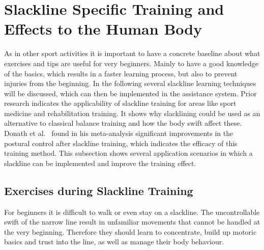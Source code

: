 \section{Slackline Specific Training and Effects to the Human Body}\label{2_2_slacklineTraining}

As in other sport activities it is important to have a concrete baseline about what exercises and tips are useful for very beginners. Mainly to have a good knowledge of the basics, which results in a faster learning process, but also to prevent injuries from the beginning. In the following several slackline learning techniques will be discussed, which can then be implemented in the assistance system. Prior research indicates the applicability of slackline training for areas like sport medicine and rehabilitation training. It shows why slacklining could be used as an alternative to classical balance training and how the body swift affect these. Donath et al.~\cite{Donath2016-rt} found in his meta-analysis significant improvements in the postural control after slackline training, which indicates the efficacy of this training method. This subsection shows several application scenarios in which a slackline can be implemented and improve the training effect.

\subsection{Exercises during Slackline Training}\label{2_1_1_slacklineTraining}

For beginners it is difficult to walk or even stay on a slackline. The uncontrollable swift of the narrow line result in unfamiliar movements that cannot be handled at the very beginning. Therefore they should learn to concentrate, build up motoric basics and trust into the line, as well as manage their body behaviour.

